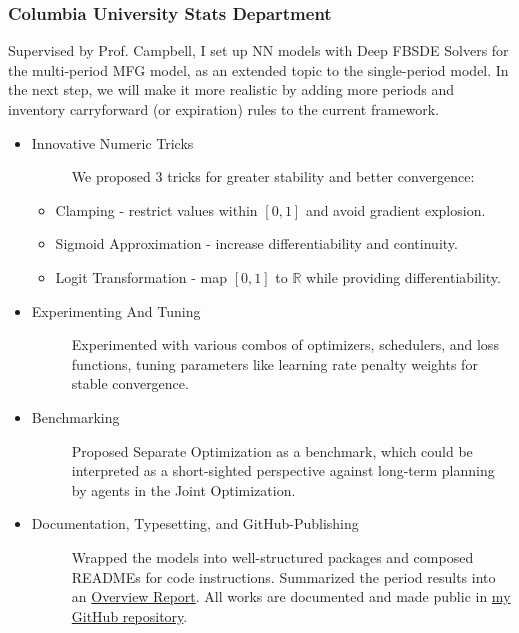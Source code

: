 \documentclass[a4paper]{article}
\newcommand{\MFG}{\href{https://github.com/OrangeAoo/Multi-Period-Compliance-MFG-FBSDEs}{my GitHub repository}}
\begin{document}
\subsubsection{Columbia University Stats Department}
\vspace{3pt}
    Supervised by Prof. Campbell, I set up NN models with Deep FBSDE Solvers for the multi-period MFG model, as an extended topic to the single-period model. In the next step, we will make it more realistic by adding more periods and inventory carryforward (or expiration) rules to the current framework.
\begin{itemize}
    \item\begin{description}
        \item[Innovative Numeric Tricks] We proposed 3 tricks for greater stability and better convergence:
    \end{description}
    \begin{itemize}
        \item Clamping - restrict values within $[0,1]$ and avoid gradient explosion.
        \item Sigmoid Approximation - increase differentiability and continuity.
        \item Logit Transformation - map $[0,1]$ to $\mathbb{R}$ while providing differentiability.
    \end{itemize}
    \item\begin{description}
        \item[Experimenting And Tuning] Experimented with various combos of optimizers, schedulers, and loss functions, tuning parameters like learning rate penalty weights for stable convergence. 
    \end{description}
    \item \begin{description}
        \item[Benchmarking] Proposed Separate Optimization as a benchmark, which could be interpreted as a short-sighted perspective against long-term planning by agents in the Joint Optimization.
    \end{description}
    \item \begin{description}
        \item[Documentation, Typesetting, and GitHub-Publishing] Wrapped the models into well-structured packages and composed READMEs for code instructions. Summarized the period results into an \href{https://github.com/OrangeAoo/Multi-Compliance-MFG-FBSDEs/blob/FBSDE/FinalReports/ReportOverview-MFG-FBSDE.pdf}{Overview Report}. All works are documented and made public in \MFG.  
    \end{description}
\end{itemize}
\end{document}
